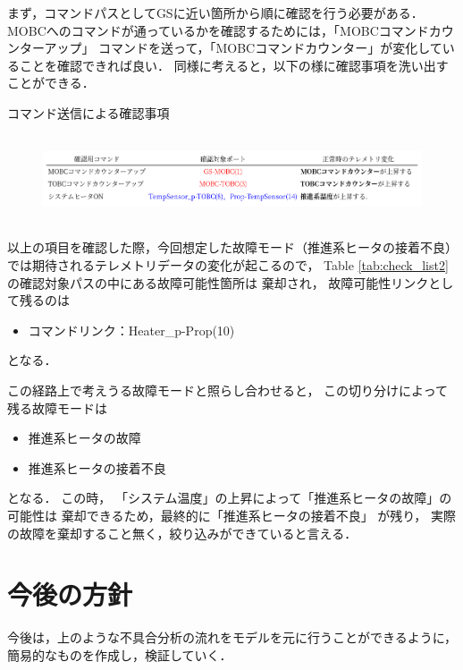 \documentclass[11pt]{article}
\begin{document}
まず，コマンドパスとしてGSに近い箇所から順に確認を行う必要がある．
MOBCへのコマンドが通っているかを確認するためには，「MOBCコマンドカウンターアップ」
コマンドを送って，「MOBCコマンドカウンター」が変化していることを確認できれば良い．
同様に考えると，以下の様に確認事項を洗い出すことができる．
\begin{table}[H]
   \centering
   \caption{コマンド送信による確認事項} 
   \label{tab:check_list2}
\end{table}
\vspace{-2zh}
\begin{figure}[H]
   \centering
      \includegraphics[height=2.6cm]{figure/check_list.png}
\end{figure}
以上の項目を確認した際，今回想定した故障モード（推進系ヒータの接着不良）
では期待されるテレメトリデータの変化が起こるので，
Table \ref{tab:check_list2}の確認対象パスの中にある故障可能性箇所は
棄却され，
故障可能性リンクとして残るのは
\begin{itemize}
   \item コマンドリンク：Heater\_p-Prop(10)
\end{itemize}
となる．


この経路上で考えうる故障モードと照らし合わせると，
この切り分けによって残る故障モードは
\begin{itemize}
   \item 推進系ヒータの故障
   \item 推進系ヒータの接着不良
\end{itemize}
となる．
この時，
「システム温度」の上昇によって「推進系ヒータの故障」の可能性は
棄却できるため，最終的に「推進系ヒータの接着不良」
が残り，
実際の故障を棄却すること無く，絞り込みができていると言える．\\

\section{今後の方針}
今後は，上のような不具合分析の流れをモデルを元に行うことができるように，
簡易的なものを作成し，検証していく．
\end{document}
